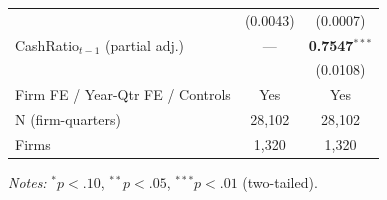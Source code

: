 \begin{table}[htbp]
\begin{tabular}{lcc}
 & (0.0043) & (0.0007) \\
CashRatio$_{t-1}$ (partial adj.) & --- & \textbf{0.7547}$^{***}$ \\
 &  & (0.0108) \\
\midrule
Firm FE / Year-Qtr FE / Controls & Yes & Yes \\
N (firm-quarters) & 28,102 & 28,102 \\
Firms & 1,320 & 1,320 \\
\bottomrule
\end{tabular}
\begin{minipage}{\linewidth}\vspace{2pt}\scriptsize
\textit{Notes:} $^{*}p<.10$, $^{**}p<.05$, $^{***}p<.01$ (two-tailed).
\end{minipage}
\end{table}